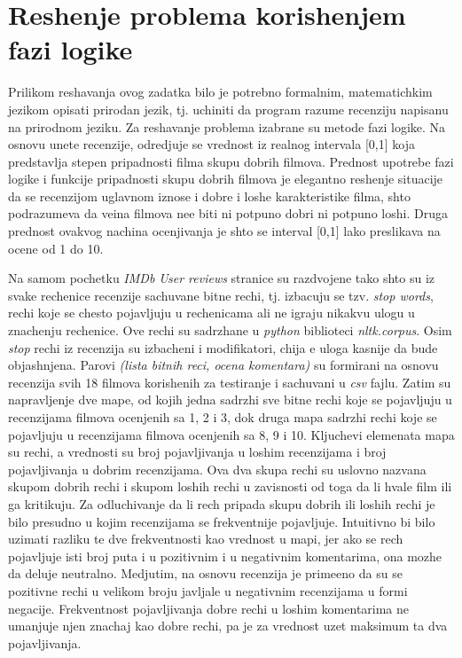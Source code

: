 \documentclass[cyr]{bibl}
\begin{document}
\pagebreak

\section{Reshenje problema korish\cc enjem fazi logike}
\begin{justify}

Prilikom reshavanja ovog zadatka bilo je potrebno formalnim, matematichkim jezikom opisati prirodan jezik, tj. uchiniti da program razume recenziju napisanu na prirodnom jeziku. Za reshavanje problema izabrane su metode fazi logike. Na osnovu unete recenzije, odredjuje se vrednost iz realnog intervala [0,1] koja predstavlja stepen pripadnosti filma skupu dobrih filmova. Prednost upotrebe fazi logike i funkcije pripadnosti skupu dobrih filmova je elegantno reshenje situacije da se recenzijom uglavnom iznose i dobre i loshe karakteristike filma, shto podrazumeva da ve\cc ina filmova ne\cc e biti ni potpuno dobri ni potpuno loshi. Druga prednost ovakvog nachina ocenjivanja je shto se interval [0,1] lako preslikava na ocene od 1 do 10.

Na samom pochetku \textit{\Lat IMDb User reviews} stranice su razdvojene tako shto su iz svake rechenice recenzije sachuvane bitne rechi, tj. izbacuju se tzv. \textit{\Lat stop words}, rechi koje se chesto pojavljuju u rechenicama ali ne igraju nikakvu ulogu u znachenju rechenice. Ove rechi su sadrzhane u \textit{\Lat python} biblioteci \textit{\Lat nltk.corpus}. Osim \textit{\Lat stop} rechi iz recenzija su izbacheni i modifikatori, chija \cc e uloga kasnije da bude objashnjena. Parovi \textit{\Lat (lista bitnih reci, ocena komentara)} su formirani na osnovu recenzija svih 18 filmova korish\cc enih za testiranje i sachuvani u \textit{\Lat csv} fajlu. Zatim su napravljenje dve mape, od kojih jedna sadrzhi sve bitne rechi koje se pojavljuju u recenzijama filmova ocenjenih sa 1, 2 i 3, dok druga mapa sadrzhi rechi koje se pojavljuju u recenzijama filmova ocenjenih sa 8, 9 i 10. Kljuchevi elemenata mapa su rechi, a vrednosti su broj pojavljivanja u loshim recenzijama i broj pojavljivanja u dobrim recenzijama. Ova dva skupa rechi su uslovno nazvana skupom dobrih rechi i skupom loshih rechi u zavisnosti od toga da li hvale film ili ga kritikuju. Za odluchivanje da li rech pripada skupu dobrih ili loshih rechi je bilo presudno u kojim recenzijama se frekventnije pojavljuje. Intuitivno bi bilo uzimati razliku te dve frekventnosti kao vrednost u mapi, jer ako se rech pojavljuje isti broj puta i u pozitivnim i u negativnim komentarima, ona mozhe da deluje neutralno. Medjutim, na osnovu recenzija je prime\cc eno da su se pozitivne rechi u velikom broju javljale u negativnim recenzijama u formi negacije. Frekventnost pojavljivanja dobre rechi u loshim komentarima ne umanjuje njen znachaj kao dobre rechi, pa je za vrednost uzet maksimum ta dva pojavljivanja.


\end{justify}
\end{document}
